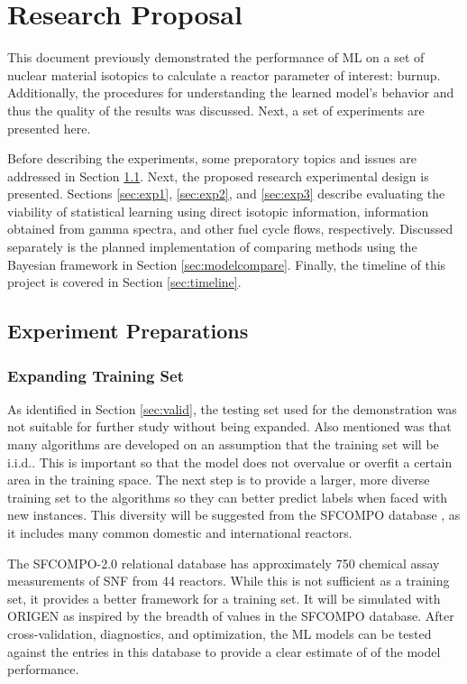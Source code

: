\chapter{Research Proposal}
\label{ch:proposal}

This document previously demonstrated the performance of \gls{ML} on a
set of nuclear material isotopics to calculate a reactor parameter of interest:
burnup.  Additionally, the procedures for understanding the learned model's
behavior and thus the quality of the results was discussed.  Next, a set of
experiments are presented here. 

Before describing the experiments, some preporatory topics and issues are
addressed in Section \ref{sec:prep}.  Next, the proposed research experimental
design is presented. Sections \ref{sec:exp1}, \ref{sec:exp2}, and
\ref{sec:exp3} describe evaluating the viability of statistical learning using
direct isotopic information, information obtained from gamma spectra, and other
fuel cycle flows, respectively.  Discussed separately is the planned
implementation of comparing methods using the Bayesian framework in Section
\ref{sec:modelcompare}. Finally, the timeline of this project is covered in
Section \ref{sec:timeline}.

\section{Experiment Preparations}
\label{sec:prep}

\subsection*{Expanding Training Set}

As identified in Section \ref{sec:valid}, the testing set used for the
demonstration was not suitable for further study without being expanded. Also
mentioned was that many algorithms are developed on an assumption that the
training set will be \acrfull{i.i.d.}.  This is important so that the model
does not overvalue or overfit a certain area in the training space.  The next
step is to provide a larger, more diverse training set to the algorithms so
they can better predict labels when faced with new instances. This diversity
will be suggested from the \gls{SFCOMPO} database \cite{sfcompo}, as it
includes many common domestic and international reactors.

The SFCOMPO-2.0 relational database \cite{sfcompo} has approximately 750
chemical assay measurements of \gls{SNF} from 44 reactors. While this is not
sufficient as a training set, it provides a better framework for a training
set. It will be simulated with \gls{ORIGEN} as inspired by the breadth of
values in the \gls{SFCOMPO} database. After cross-validation, diagnostics, and
optimization, the \gls{ML} models can be tested against the entries in this
database to provide a clear estimate of of the model performance. 

